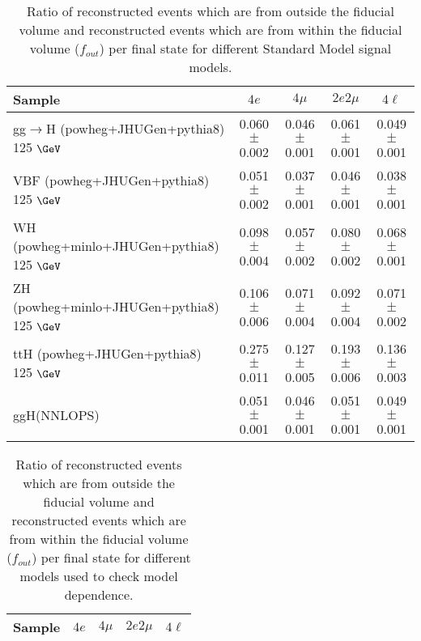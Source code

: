 \documentclass{article}
\begin{document}
\begin{table}[!h!tb]
\begin{center}
\small
\caption{
Ratio of reconstructed events which are from outside the fiducial volume and reconstructed events which are from within the fiducial volume ($f_{out}$) per final state for different Standard Model signal models.
\label{tab:foutSM}
}
\begin{tabular}{|l|c|c|c|c|} \hline 
Sample & $4e$ & $4\mu$ & $2e2\mu$ & $4\ell$ \\ \hline 
gg$\rightarrow$H ({\sc powheg+JHUGen+pythia8}) 125 $\GeV$ & 0.060 $\pm$ 0.002 & 0.046 $\pm$ 0.001 & 0.061 $\pm$ 0.001 & 0.049 $\pm$ 0.001 \\ 
VBF ({\sc powheg+JHUGen+pythia8}) 125 $\GeV$ & 0.051 $\pm$ 0.002 & 0.037 $\pm$ 0.001 & 0.046 $\pm$ 0.001 & 0.038 $\pm$ 0.001 \\ 
WH ({\sc powheg+minlo+JHUGen+pythia8}) 125 $\GeV$ & 0.098 $\pm$ 0.004 & 0.057 $\pm$ 0.002 & 0.080 $\pm$ 0.002 & 0.068 $\pm$ 0.001 \\ 
ZH ({\sc powheg+minlo+JHUGen+pythia8}) 125 $\GeV$ & 0.106 $\pm$ 0.006 & 0.071 $\pm$ 0.004 & 0.092 $\pm$ 0.004 & 0.071 $\pm$ 0.002 \\ 
ttH ({\sc powheg+JHUGen+pythia8}) 125 $\GeV$ & 0.275 $\pm$ 0.011 & 0.127 $\pm$ 0.005 & 0.193 $\pm$ 0.006 & 0.136 $\pm$ 0.003 \\ 
ggH(NNLOPS) & 0.051 $\pm$ 0.001 & 0.046 $\pm$ 0.001 & 0.051 $\pm$ 0.001 & 0.049 $\pm$ 0.001 \\ 

\hline
\end{tabular}
\normalsize
\end{center}
\end{table}
 
 
 
\begin{table}[!h!tb]
\begin{center}
\small
\caption{
Ratio of reconstructed events which are from outside the fiducial volume and reconstructed events which are from within the fiducial volume ($f_{out}$) per final state for different models used to check model dependence.
\label{tab:foutExo}
}
\begin{tabular}{|l|c|c|c|c|} \hline 
Sample & $4e$ & $4\mu$ & $2e2\mu$ & $4\ell$ \\ \hline 

\hline
\end{tabular}
\normalsize
\end{center}
\end{table}
 
\end{document}
